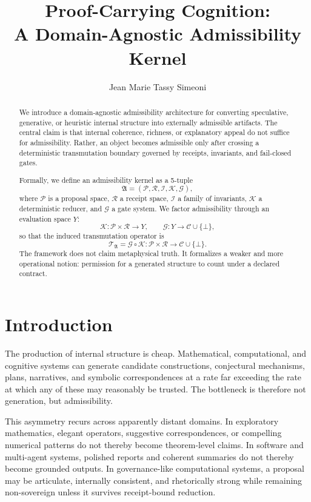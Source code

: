 \documentclass[12pt]{amsart}
\title{Proof-Carrying Cognition:\\
A Domain-Agnostic Admissibility Kernel}
\author{Jean Marie Tassy Simeoni}
\date{}
\numberwithin{equation}{section}
\theoremstyle{definition}
\theoremstyle{remark}
\newcommand{\PP}{\mathcal P}
\newcommand{\RRc}{\mathcal R}
\newcommand{\II}{\mathcal I}
\newcommand{\KK}{\mathcal K}
\newcommand{\GG}{\mathcal G}
\newcommand{\CC}{\mathcal C}
\newcommand{\YY}{Y}
\newcommand{\TT}{\mathcal T}
\begin{document}
\maketitle

\begin{abstract}
We introduce a domain-agnostic admissibility architecture for converting speculative, generative,
or heuristic internal structure into externally admissible artifacts.  The central claim is that
internal coherence, richness, or explanatory appeal do not suffice for admissibility.  Rather, an
object becomes admissible only after crossing a deterministic transmutation boundary governed by
receipts, invariants, and fail-closed gates.

Formally, we define an admissibility kernel as a 5-tuple
\[
  \mathfrak A=(\PP,\RRc,\II,\KK,\GG),
\]
where $\PP$ is a proposal space, $\RRc$ a receipt space, $\II$ a family of invariants, $\KK$ a
deterministic reducer, and $\GG$ a gate system.  We factor admissibility through an evaluation
space $\YY$:
\[
  \KK:\PP\times\RRc\to \YY, \qquad \GG:\YY\to \CC\cup\{\bot\},
\]
so that the induced transmutation operator is
\[
  \TT_{\mathfrak A}=\GG\circ\KK:\PP\times\RRc\to\CC\cup\{\bot\}.
\]
The framework does not claim metaphysical truth.  It formalizes a weaker and more operational
notion: permission for a generated structure to count under a declared contract.
\end{abstract}

\section{Introduction}

The production of internal structure is cheap.  Mathematical, computational, and cognitive systems
can generate candidate constructions, conjectural mechanisms, plans, narratives, and symbolic
correspondences at a rate far exceeding the rate at which any of these may reasonably be trusted.
The bottleneck is therefore not generation, but admissibility.

This asymmetry recurs across apparently distant domains.  In exploratory mathematics, elegant
operators, suggestive correspondences, or compelling numerical patterns do not thereby become
theorem-level claims.  In software and multi-agent systems, polished reports and coherent summaries
do not thereby become grounded outputs.  In governance-like computational systems, a proposal may
be articulate, internally consistent, and rhetorically strong while remaining non-sovereign unless
it survives receipt-bound reduction.
\end{document}
